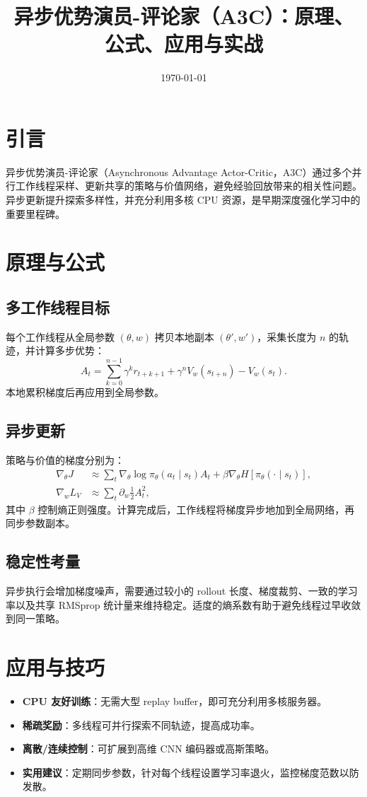 \documentclass[UTF8,zihao=-4]{ctexart}
\title{异步优势演员-评论家（A3C）：原理、公式、应用与实战}
\author{}
\date{\today}
\begin{document}
\maketitle

\section{引言}
异步优势演员-评论家（Asynchronous Advantage Actor-Critic，A3C）通过多个并行工作线程采样、更新共享的策略与价值网络，避免经验回放带来的相关性问题。异步更新提升探索多样性，并充分利用多核 CPU 资源，是早期深度强化学习中的重要里程碑。

\section{原理与公式}
\subsection{多工作线程目标}
每个工作线程从全局参数 \((\theta, w)\) 拷贝本地副本 \((\theta', w')\)，采集长度为 \(n\) 的轨迹，并计算多步优势：
\begin{equation}
A_t = \sum_{k=0}^{n-1} \gamma^k r_{t+k+1} + \gamma^n V_w(s_{t+n}) - V_w(s_t).
\end{equation}
本地累积梯度后再应用到全局参数。

\subsection{异步更新}
策略与价值的梯度分别为：
\begin{align}
\nabla_\theta J &\approx \sum_t \nabla_\theta \log \pi_\theta(a_t\mid s_t) A_t + \beta \nabla_\theta H[\pi_\theta(\cdot\mid s_t)],\\
\nabla_w L_V &\approx \sum_t \partial_w \frac{1}{2} A_t^2,
\end{align}
其中 \(\beta\) 控制熵正则强度。计算完成后，工作线程将梯度异步地加到全局网络，再同步参数副本。

\subsection{稳定性考量}
异步执行会增加梯度噪声，需要通过较小的 rollout 长度、梯度裁剪、一致的学习率以及共享 RMSprop 统计量来维持稳定。适度的熵系数有助于避免线程过早收敛到同一策略。

\section{应用与技巧}
\begin{itemize}
  \item \textbf{CPU 友好训练}：无需大型 replay buffer，即可充分利用多核服务器。
  \item \textbf{稀疏奖励}：多线程可并行探索不同轨迹，提高成功率。
  \item \textbf{离散/连续控制}：可扩展到高维 CNN 编码器或高斯策略。
  \item \textbf{实用建议}：定期同步参数，针对每个线程设置学习率退火，监控梯度范数以防发散。
\end{itemize}
\end{document}
